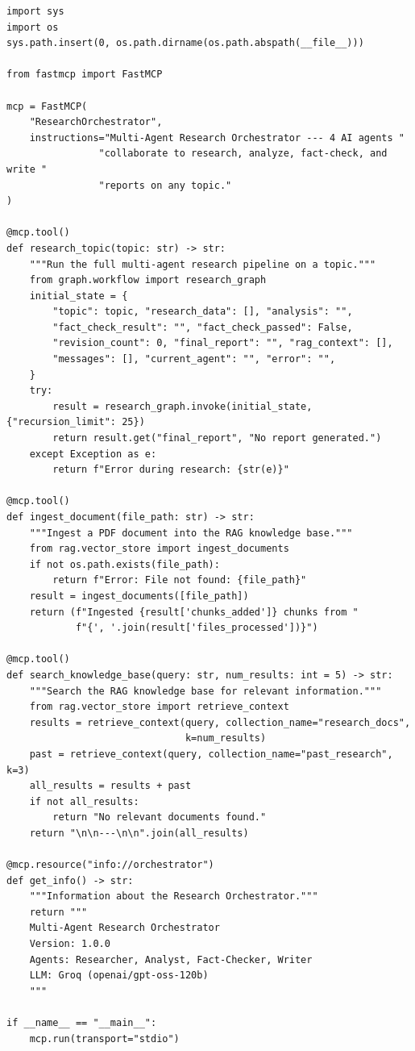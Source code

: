 \documentclass[11pt, a4paper]{article}
\begin{document}
\begin{lstlisting}[style=pythonstyle, caption={mcp\_server.py --- Key Parts}]
import sys
import os
sys.path.insert(0, os.path.dirname(os.path.abspath(__file__)))

from fastmcp import FastMCP

mcp = FastMCP(
    "ResearchOrchestrator",
    instructions="Multi-Agent Research Orchestrator --- 4 AI agents "
                "collaborate to research, analyze, fact-check, and write "
                "reports on any topic."
)

@mcp.tool()
def research_topic(topic: str) -> str:
    """Run the full multi-agent research pipeline on a topic."""
    from graph.workflow import research_graph
    initial_state = {
        "topic": topic, "research_data": [], "analysis": "",
        "fact_check_result": "", "fact_check_passed": False,
        "revision_count": 0, "final_report": "", "rag_context": [],
        "messages": [], "current_agent": "", "error": "",
    }
    try:
        result = research_graph.invoke(initial_state, {"recursion_limit": 25})
        return result.get("final_report", "No report generated.")
    except Exception as e:
        return f"Error during research: {str(e)}"

@mcp.tool()
def ingest_document(file_path: str) -> str:
    """Ingest a PDF document into the RAG knowledge base."""
    from rag.vector_store import ingest_documents
    if not os.path.exists(file_path):
        return f"Error: File not found: {file_path}"
    result = ingest_documents([file_path])
    return (f"Ingested {result['chunks_added']} chunks from "
            f"{', '.join(result['files_processed'])}")

@mcp.tool()
def search_knowledge_base(query: str, num_results: int = 5) -> str:
    """Search the RAG knowledge base for relevant information."""
    from rag.vector_store import retrieve_context
    results = retrieve_context(query, collection_name="research_docs",
                               k=num_results)
    past = retrieve_context(query, collection_name="past_research", k=3)
    all_results = results + past
    if not all_results:
        return "No relevant documents found."
    return "\n\n---\n\n".join(all_results)

@mcp.resource("info://orchestrator")
def get_info() -> str:
    """Information about the Research Orchestrator."""
    return """
    Multi-Agent Research Orchestrator
    Version: 1.0.0
    Agents: Researcher, Analyst, Fact-Checker, Writer
    LLM: Groq (openai/gpt-oss-120b)
    """

if __name__ == "__main__":
    mcp.run(transport="stdio")
\end{lstlisting}
\end{document}
